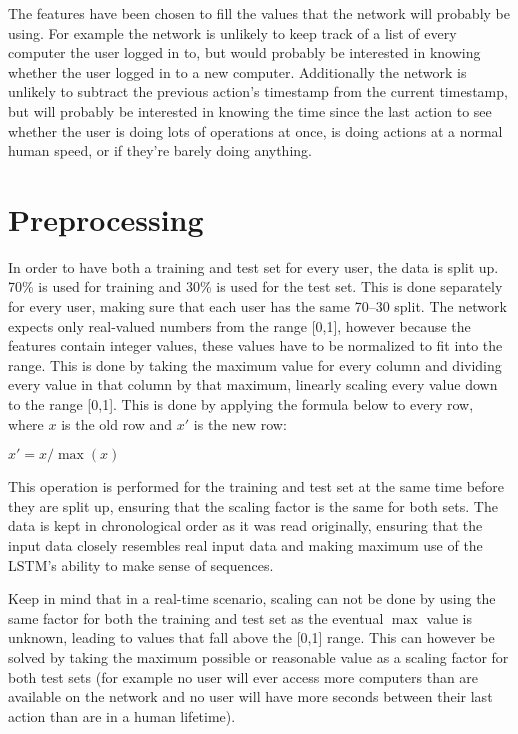 The features have been chosen to fill the values that the network will probably be using. For example the network is unlikely to keep track of a list of every computer the user logged in to, but would probably be interested in knowing whether the user logged in to a new computer. Additionally the network is unlikely to subtract the previous action's timestamp from the current timestamp, but will probably be interested in knowing the time since the last action to see whether the user is doing lots of operations at once, is doing actions at a normal human speed, or if they're barely doing anything.

\section{Preprocessing}
In order to have both a training and test set for every user, the data is split up. 70\% is used for training and 30\% is used for the test set. This is done separately for every user, making sure that each user has the same 70--30 split. The network expects only real-valued numbers from the range [0,1], however because the features contain integer values, these values have to be normalized to fit into the range. This is done by taking the maximum value for every column and dividing every value in that column by that maximum, linearly scaling every value down to the range [0,1]. This is done by applying the formula below to every row, where \(x\) is the old row and \(x'\) is the new row:

\( x' = x / \max (x) \)

This operation is performed for the training and test set at the same time before they are split up, ensuring that the scaling factor is the same for both sets. The data is kept in chronological order as it was read originally, ensuring that the input data closely resembles real input data and making maximum use of the LSTM's ability to make sense of sequences.

Keep in mind that in a real-time scenario, scaling can not be done by using the same factor for both the training and test set as the eventual \(\max \) value is unknown, leading to values that fall above the [0,1] range. This can however be solved by taking the maximum possible or reasonable value as a scaling factor for both test sets (for example no user will ever access more computers than are available on the network and no user will have more seconds between their last action than are in a human lifetime).

